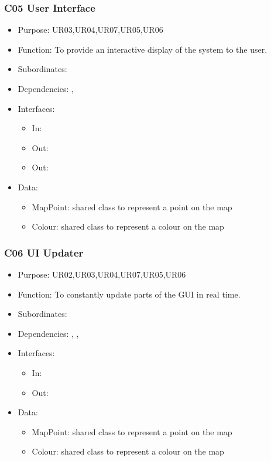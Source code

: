 \subsubsection{C05 User Interface} \label{compUI}
\begin{itemize}
	\item Purpose: UR03,UR04,UR07,UR05,UR06
	\item Function: To provide an interactive display of the system to the user. 
	\item Subordinates: 
	\item Dependencies: , 
	\item Interfaces:
	\begin{itemize}
		\item In: \texttt{}
		\item Out: \texttt{}
		\item Out: \texttt{}
	\end{itemize}
	\item Data:
	\begin{itemize}
		\item MapPoint: shared class to represent a point on the map
		\item Colour: shared class to represent a colour on the map
	\end{itemize}
\end{itemize}

\subsubsection{C06 UI Updater} \label{compUIUpdater}
\begin{itemize}
	\item Purpose: UR02,UR03,UR04,UR07,UR05,UR06
	\item Function: To constantly update parts of the GUI in real time. 
	\item Subordinates:
	\item Dependencies: , , 
	\item Interfaces:
	\begin{itemize}
		\item In: \texttt{}
		\item Out: \texttt{}
	\end{itemize}
	\item Data:
	\begin{itemize}
		\item MapPoint: shared class to represent a point on the map
		\item Colour: shared class to represent a colour on the map
	\end{itemize}
\end{itemize}

